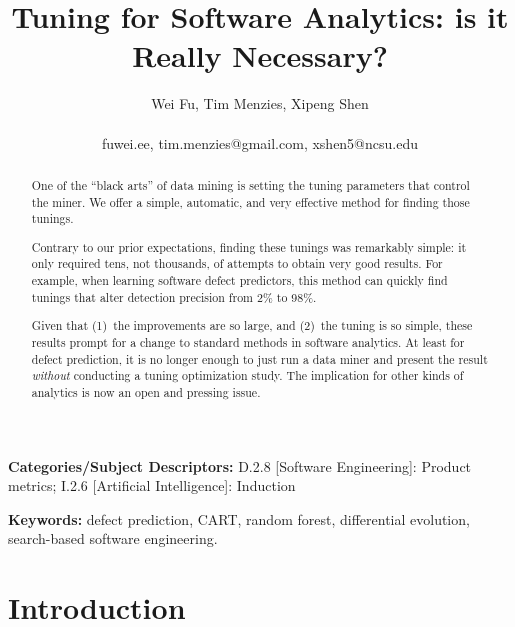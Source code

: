 \documentclass{sig-alternative}
\begin{document}
\title{ Tuning for Software Analytics: is it Really Necessary?}
\author{\alignauthor Wei Fu, Tim Menzies, Xipeng Shen \\
       \\
       fuwei.ee, tim.menzies@gmail.com, xshen5@ncsu.edu }
\maketitle 
\thispagestyle{plain}
\pagestyle{plain}
\begin{abstract}
One of the ``black arts'' of data mining is setting the tuning
parameters that control  the miner.  We offer a simple,
automatic, and very effective  method for finding those tunings.

Contrary to our prior expectations, finding these tunings
 was remarkably simple: it only required tens, not thousands, of attempts
 to obtain very good results.
For example, when  learning
software defect predictors, this  method can quickly
find tunings  that  alter detection  precision  
 from 2\% to 98\%. 

Given that (1)~the improvements are so large, and (2)~the tuning is so simple,
these results prompt for a change to standard methods in software analytics.
At least for defect prediction, 
it is no longer enough to just run a data miner and present the result
{\em without}  conducting a tuning optimization study.
The implication for other kinds of  analytics is now  an open and pressing issue.


\end{abstract}

\vspace{1mm}
\noindent
{\bf Categories/Subject Descriptors:} 
D.2.8 [Software Engineering]: Product metrics;
I.2.6 [Artificial Intelligence]: Induction

 
\vspace{1mm}
\noindent
{\bf Keywords:} defect prediction, CART, random forest,
differential evolution,
search-based software engineering.

 
 
\section{Introduction}
 
\end{document}

